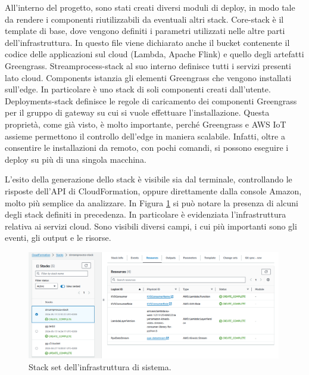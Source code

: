 All'interno del progetto, sono stati creati diversi moduli di deploy, in modo tale da rendere i componenti riutilizzabili da eventuali altri stack. Core-stack è il template di base, dove vengono definiti i parametri utilizzati nelle altre parti dell'infrastruttura. In questo file viene dichiarato anche il bucket contenente il codice delle applicazioni sul cloud (Lambda, Apache Flink) e quello degli artefatti Greengrass. Streamprocess-stack al suo interno definisce tutti i servizi presenti lato cloud. Components istanzia gli elementi Greengrass che vengono installati sull'edge. In particolare è uno stack di soli componenti creati dall’utente. Deployments-stack definisce le regole di caricamento dei componenti Greengrass per il gruppo di gateway su cui si vuole effettuare l'installazione. Questa proprietà, come già visto, è molto importante, perché Greengrass e AWS IoT assieme permettono il controllo dell'edge in maniera scalabile. Infatti, oltre a consentire le installazioni da remoto, con pochi comandi, si possono eseguire i deploy su più di una singola macchina. 

L'esito della generazione dello stack è visibile sia dal terminale, controllando le risposte dell'API di CloudFormation, oppure direttamente dalla console Amazon, molto più semplice da analizzare. In Figura \ref{fig:stack-set} si può notare la presenza di alcuni degli stack definiti in precedenza. In particolare è evidenziata l'infrastruttura relativa ai servizi cloud. Sono visibili diversi campi, i cui più importanti sono gli eventi, gli output e le risorse. 

\vspace{0.5cm}
\begin{figure}[htbp]
    \centering
    \includegraphics[width=0.99\textwidth]{figures/stack-set.png}
    \caption{Stack set dell'infrastruttura di sistema.} 
    \label{fig:stack-set}
\end{figure}

